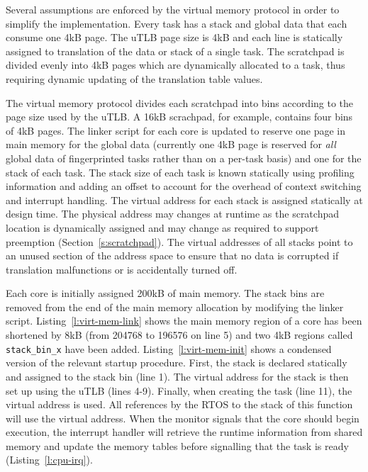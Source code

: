 	Several assumptions are enforced by the virtual memory protocol in order to simplify the implementation. 
	Every task has a stack and global data that each consume one 4kB page.
	The uTLB page size is 4kB and each line is statically assigned to translation of the data or stack of a single task.
	The scratchpad is divided evenly into 4kB pages which are dynamically allocated to a task, thus requiring dynamic updating of the translation table values.

	
	The virtual memory protocol divides each scratchpad into bins according to the page size used by the uTLB. 
	A 16kB scrachpad, for example, contains four bins of 4kB pages.  
	The linker script for each core is updated to reserve one page in main memory for the global data (currently one 4kB page is reserved for \emph{all} global data of fingerprinted tasks rather than on a per-task basis) and one for the stack of each task. 
	The stack size of each task is known statically using profiling information and adding an offset to account for the overhead of context switching and interrupt handling. 
	The virtual address for each stack is assigned statically at design time. 
	The physical address may changes at runtime as the scratchpad location is dynamically assigned and may change as required to support preemption (Section~\ref{s:scratchpad}). 
	The virtual addresses of all stacks point to an unused section of the address space to ensure that no data is corrupted if translation malfunctions or is accidentally turned off.
	
	Each core is initially assigned 200kB of main memory. 
	The stack bins are removed from the end of the main memory allocation by modifying the linker script.
	Listing~\ref{l:virt-mem-link} shows the main memory region of a core has been shortened by 8kB (from 204768 to 196576 on line 5) and two 4kB regions called \texttt{stack\_bin\_x} have been added. 
	Listing~\ref{l:virt-mem-init} shows a condensed version of the relevant startup procedure. 
	First, the stack is declared statically and assigned to the stack bin (line 1). 
	The virtual address for the stack is then set up using the uTLB (lines 4-9). 
	Finally, when creating the task (line 11), the virtual address is used. 
	All references by the RTOS to the stack of this function will use the virtual address. 
	When the monitor signals that the core should begin execution, the interrupt handler will retrieve the runtime information from shared memory and update the memory tables before signalling that the task is ready (Listing~\ref{l:cpu-irq}).


